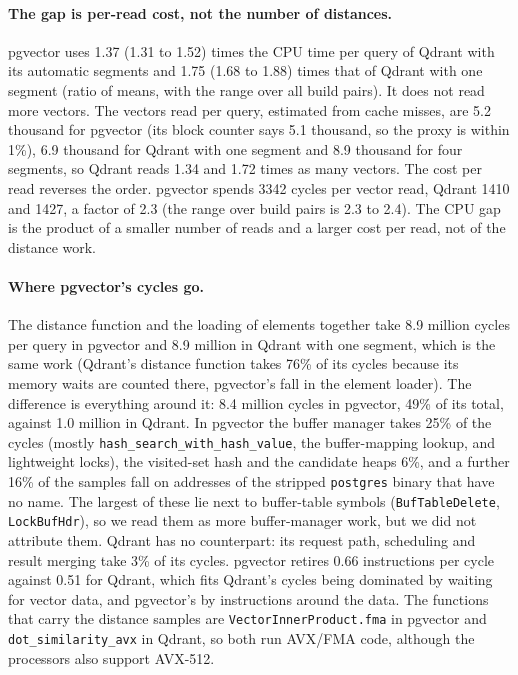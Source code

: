 \documentclass[preprint,12pt]{elsarticle}
\begin{document}
\paragraph{The gap is per-read cost, not the number of distances.}
pgvector uses 1.37 (1.31 to 1.52) times the CPU time per query of Qdrant with its automatic segments and 1.75 (1.68 to 1.88) times that of Qdrant with one
segment (ratio of means, with the range over all build pairs). It does not read more vectors. The vectors read per query,
estimated from cache misses, are 5.2 thousand for pgvector (its block counter says 5.1 thousand, so the proxy
is within 1\%), 6.9 thousand for Qdrant with one segment and 8.9 thousand for four segments, so Qdrant reads 1.34 and 1.72
times as many vectors. The cost per read reverses the order. pgvector spends 3342 cycles per vector read, Qdrant 1410
and 1427, a factor of 2.3 (the range over build pairs is 2.3 to 2.4). The CPU gap is the product of a smaller number of
reads and a larger cost per read, not of the distance work.

\paragraph{Where pgvector's cycles go.} The distance function and the loading of elements together take
8.9 million cycles per query in pgvector and 8.9 million in Qdrant with one segment, which is the same work
(Qdrant's distance function takes 76\% of its cycles because its memory waits are counted there, pgvector's
fall in the element loader). The difference is everything around it: 8.4 million cycles
in pgvector, 49\% of its total, against 1.0 million in Qdrant. In pgvector the buffer manager takes 25\% of the cycles
(mostly \texttt{hash\_search\_with\_hash\_value}, the buffer-mapping lookup, and lightweight locks), the
visited-set hash and the candidate heaps 6\%, and a further 16\% of the samples fall on addresses of the stripped
\texttt{postgres} binary that have no name. The largest of these lie next to buffer-table symbols
(\texttt{BufTableDelete}, \texttt{LockBufHdr}), so we read them as more buffer-manager work, but we did not attribute them.
Qdrant has no counterpart: its request path, scheduling and result merging take 3\% of its cycles.
pgvector retires 0.66 instructions per cycle against 0.51 for Qdrant, which fits Qdrant's cycles being dominated by waiting
for vector data, and pgvector's by instructions around the data. The functions that carry the distance samples are
\texttt{VectorInnerProduct.fma} in pgvector and \texttt{dot\_similarity\_avx} in Qdrant, so both run AVX/FMA code, although
the processors also support AVX-512.
\end{document}
